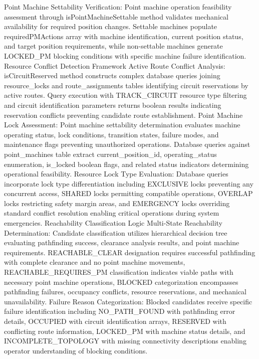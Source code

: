 Point Machine Settability Verification: Point machine operation feasibility assessment through isPointMachineSettable method validates mechanical availability for required position changes. Settable machines populate requiredPMActions array with machine identification, current position status, and target position requirements, while non-settable machines generate LOCKED_PM blocking conditions with specific machine failure identification.
Resource Conflict Detection Framework
Active Route Conflict Analysis: isCircuitReserved method constructs complex database queries joining resource_locks and route_assignments tables identifying circuit reservations by active routes. Query execution with TRACK_CIRCUIT resource type filtering and circuit identification parameters returns boolean results indicating reservation conflicts preventing candidate route establishment.
Point Machine Lock Assessment: Point machine settability determination evaluates machine operating status, lock conditions, transition states, failure modes, and maintenance flags preventing unauthorized operations. Database queries against point_machines table extract current_position_id, operating_status enumeration, is_locked boolean flags, and related status indicators determining operational feasibility.
Resource Lock Type Evaluation: Database queries incorporate lock type differentiation including EXCLUSIVE locks preventing any concurrent access, SHARED locks permitting compatible operations, OVERLAP locks restricting safety margin areas, and EMERGENCY locks overriding standard conflict resolution enabling critical operations during system emergencies.
Reachability Classification Logic
Multi-State Reachability Determination: Candidate classification utilizes hierarchical decision tree evaluating pathfinding success, clearance analysis results, and point machine requirements. REACHABLE_CLEAR designation requires successful pathfinding with complete clearance and no point machine movements, REACHABLE_REQUIRES_PM classification indicates viable paths with necessary point machine operations, BLOCKED categorization encompasses pathfinding failures, occupancy conflicts, resource reservations, and mechanical unavailability.
Failure Reason Categorization: Blocked candidates receive specific failure identification including NO_PATH_FOUND with pathfinding error details, OCCUPIED with circuit identification arrays, RESERVED with conflicting route information, LOCKED_PM with machine status details, and INCOMPLETE_TOPOLOGY with missing connectivity descriptions enabling operator understanding of blocking conditions.
